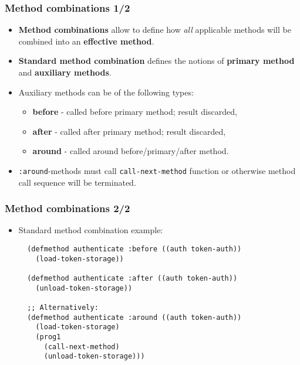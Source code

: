 \documentclass{beamer}
\begin{document}
\begin{frame}[fragile]
  \frametitle{Method combinations 1/2}
  \begin{itemize}
  \item \textbf{Method combinations} allow to define how \textit{all} applicable
    methods will be combined into an \textbf{effective method}.
  \item \textbf{Standard method combination} defines the notions of
    \textbf{primary method} and \textbf{auxiliary methods}.
  \item Auxiliary methods can be of the following types:
    \begin{itemize}
    \item \textbf{before} - called before primary method; result discarded,
    \item \textbf{after} - called after primary method; result discarded,
    \item \textbf{around} - called around before/primary/after method.
    \end{itemize}
  \item \texttt{:around}-methods must call
    \texttt{call-next-method} function or otherwise method call
    sequence will be terminated.
  \end{itemize}
\end{frame}

\begin{frame}[fragile]
  \frametitle{Method combinations 2/2}
  \begin{itemize}
  \item Standard method combination example:
\begin{verbatim}
  (defmethod authenticate :before ((auth token-auth))
    (load-token-storage))

  (defmethod authenticate :after ((auth token-auth))
    (unload-token-storage))

  ;; Alternatively:
  (defmethod authenticate :around ((auth token-auth))
    (load-token-storage)
    (prog1
      (call-next-method)
      (unload-token-storage)))
\end{verbatim}
  \end{itemize}
\end{frame}
\end{document}
